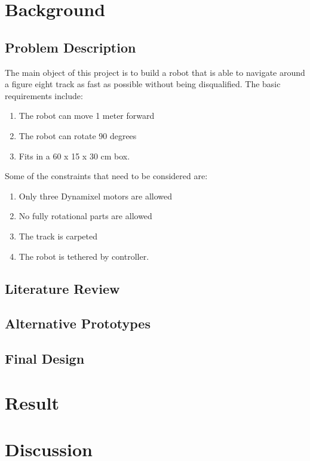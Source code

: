 \documentclass[a4paper, 12pt, oneside]{article} %
\begin{document}
\section{Background}
\subsection{Problem Description}
The main object of this project is to build a robot that is able to navigate around a figure eight track as fast as possible without being disqualified. The basic requirements include:
\begin{enumerate} 
\item The robot can move 1 meter forward 
\item The robot can rotate 90 degrees 
\item Fits in a 60 x 15 x 30 cm box.
\end{enumerate} 
Some of the constraints that need to be considered are:
\begin{enumerate} 
\item Only three Dynamixel motors are allowed 
\item No fully rotational parts are allowed 
\item The track is carpeted 
\item The robot is tethered by controller.
\end{enumerate} 
\subsection{Literature Review}
\subsection{Alternative Prototypes}
\subsection{Final Design}
\section{Result}
\section{Discussion}
\end{document}
